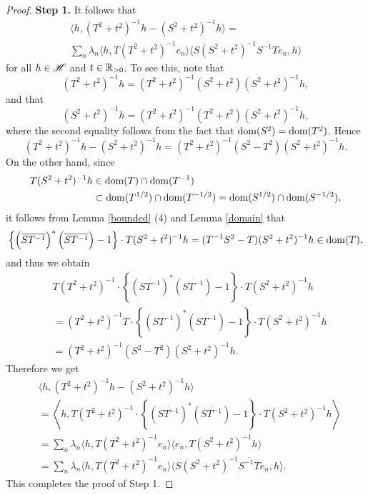 \documentclass[12pt]{article}
\theoremstyle{plain}
\numberwithin{equation}{section}
\theoremstyle{remark}
\begin{document}
\begin{proof}
\textbf{Step 1.} It follows that
\begin{multline*}
 \langle h,(T^2+t^2)^{-1}h-(S^2+t^2)^{-1}h\rangle = \\
 \sum_n\lambda_n\langle h,T(T^2+t^2)^{-1}e_n\rangle\langle S(S^2+t^2)^{-1}\overline{S^{-1}T}e_n,h\rangle
\end{multline*}
for all $h\in\mathscr{H}$ and $t\in\mathbb{R}_{>0}$. To see this, note that
\[
 (T^2+t^2)^{-1}h = (T^2+t^2)^{-1}(S^2+t^2)(S^2+t^2)^{-1}h,
\]
and that
\[
(S^2+t^2)^{-1}h = (T^2+t^2)^{-1}(T^2+t^2)(S^2+t^2)^{-1}h,
\]
where the second equality follows from the fact that $\mathop{\mathrm{dom}}(S^2)=\mathop{\mathrm{dom}}(T^2)$.
Hence
\[
 (T^2+t^2)^{-1}h - (S^2+t^2)^{-1}h = (T^2+t^2)^{-1}(S^2-T^2)(S^2+t^2)^{-1}h.
\]
On the other hand, since
\begin{align*}
 T(S^2+t^2)^{-1}h & \in \mathop{\mathrm{dom}}(T)\cap\mathop{\mathrm{dom}}(T^{-1})\\
 & \subset\mathop{\mathrm{dom}}(T^{1/2})\cap\mathop{\mathrm{dom}}(T^{-1/2})
 = \mathop{\mathrm{dom}}(S^{1/2})\cap\mathop{\mathrm{dom}}(S^{-1/2}),
\end{align*}
it follows from Lemma \ref{bounded} (4) and Lemma \ref{domain} that
\[
\left\{\left(\overline{ST^{-1}}\right)^*\left(\overline{ST^{-1}}\right)-1\right\}\cdot T(S^2+t^2)^{-1}h
=(T^{-1}S^2-T)(S^2+t^2)^{-1}h\in\mathop{\mathrm{dom}}(T),
\]
and thus we obtain
\begin{align*}
&T(T^2+t^2)^{-1}\cdot \left\{\left(\overline{ST^{-1}}\right)^*\left(\overline{ST^{-1}}\right)-1\right\}\cdot T(S^2+t^2)^{-1}h\\
&= (T^2+t^2)^{-1}T\cdot \left\{\left(\overline{ST^{-1}}\right)^*\left(\overline{ST^{-1}}\right)-1\right\}\cdot T(S^2+t^2)^{-1}h\\
&= (T^2+t^2)^{-1}(S^2-T^2)(S^2+t^2)^{-1}h.
\end{align*}
Therefore we get
\begin{align*}
&\langle h,(T^2+t^2)^{-1}h - (S^2+t^2)^{-1}h\rangle\\
&= \left\langle h,T(T^2+t^2)^{-1}\cdot \left\{\left(\overline{ST^{-1}}\right)^*
\left(\overline{ST^{-1}}\right)-1\right\}\cdot T(S^2+t^2)^{-1}h\right\rangle\\
&= \sum_n\lambda_n\langle h,T(T^2+t^2)^{-1}e_n\rangle\langle e_n,T(S^2+t^2)^{-1}h\rangle\\
&= \sum_n\lambda_n\langle h,T(T^2+t^2)^{-1}e_n\rangle\langle S(S^2+t^2)^{-1}\overline{S^{-1}T}e_n,h\rangle.
\end{align*}
This completes the proof of Step 1.


\end{proof}
\end{document}
